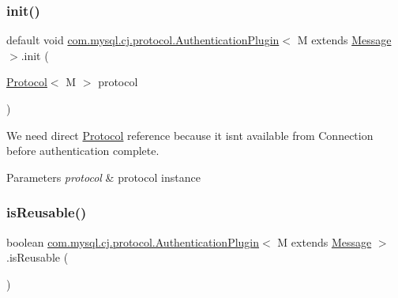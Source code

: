 \mbox{\label{interfacecom_1_1mysql_1_1cj_1_1protocol_1_1_authentication_plugin_a418637ae8546057f1bb34fde86f5b99d}} 
\subsubsection{\texorpdfstring{init()}{init()}}
{\footnotesize\ttfamily default void \mbox{\hyperlink{interfacecom_1_1mysql_1_1cj_1_1protocol_1_1_authentication_plugin}{com.\+mysql.\+cj.\+protocol.\+Authentication\+Plugin}}$<$ M extends \mbox{\hyperlink{interfacecom_1_1mysql_1_1cj_1_1protocol_1_1_message}{Message}} $>$.init (\begin{DoxyParamCaption}\item[{\mbox{\hyperlink{interfacecom_1_1mysql_1_1cj_1_1protocol_1_1_protocol}{Protocol}}$<$ M $>$}]{protocol }\end{DoxyParamCaption})}

We need direct \mbox{\hyperlink{interfacecom_1_1mysql_1_1cj_1_1protocol_1_1_protocol}{Protocol}} reference because it isn\textquotesingle{}t available from Connection before authentication complete.


\begin{DoxyParams}{Parameters}
{\em protocol} & protocol instance \\
\hline
\end{DoxyParams}
\mbox{\label{interfacecom_1_1mysql_1_1cj_1_1protocol_1_1_authentication_plugin_afff2eda7e67e6847d2401461100e2c69}} 
\subsubsection{\texorpdfstring{is\+Reusable()}{isReusable()}}
{\footnotesize\ttfamily boolean \mbox{\hyperlink{interfacecom_1_1mysql_1_1cj_1_1protocol_1_1_authentication_plugin}{com.\+mysql.\+cj.\+protocol.\+Authentication\+Plugin}}$<$ M extends \mbox{\hyperlink{interfacecom_1_1mysql_1_1cj_1_1protocol_1_1_message}{Message}} $>$.is\+Reusable (\begin{DoxyParamCaption}{ }\end{DoxyParamCaption})}

